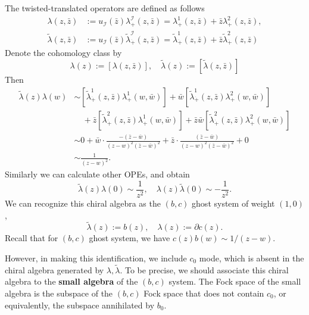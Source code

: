 \documentclass[a4paper,11pt]{article}
\begin{document}
The twisted-translated operators are defined as follows
\begin{equation}
\begin{aligned}
    \lambda(z, \bar{z}) &:= u_\mathcal{I}(\bar{z}) \lambda_+^\mathcal{I}(z, \bar{z}) = \lambda^1_+(z, \bar{z}) + \bar{z} \lambda^2_+(z, \bar{z}),\\
    \tilde{\lambda}(z, \bar{z}) &:= u_\mathcal{I}(\bar{z}) \tilde{\lambda}_{\dot{+}}^\mathcal{I}(z, \bar{z}) = \tilde{\lambda}^1_{\dot{+}}(z, \bar{z}) + \bar{z} \tilde{\lambda}^2_{\dot{+}}(z, \bar{z})
\end{aligned}
\end{equation}
Denote the cohomology class by
\begin{equation}
    \lambda(z) := [\lambda(z, \bar{z})], \quad \tilde{\lambda}(z) := [\tilde{\lambda}(z, \bar{z})]
\end{equation}
Then
\begin{equation}
\begin{aligned}
    \tilde{\lambda}(z) \lambda(w) &\sim [\tilde{\lambda}^1_{\dot{+}}(z, \bar{z}) \lambda^1_+(w, \bar{w})] + \bar{w} [\tilde{\lambda}^1_{\dot{+}}(z, \bar{z}) \lambda_+^2(w, \bar{w})] \\
    & \quad + \bar{z} [\tilde{\lambda}^2_{\dot{+}}(z, \bar{z}) \lambda_+^1(w, \bar{w})] + \bar{z} \bar{w} [\tilde{\lambda}^2_{\dot{+}}(z, \bar{z}) \lambda_+^2(w, \bar{w})]\\
    &\sim 0 + \bar{w} \cdot \frac{-(\bar{z} - \bar{w})}{(z-w)^2 (\bar{z} - \bar{w})^2} + \bar{z} \cdot \frac{(\bar{z} - \bar{w})}{(z-w)^2 (\bar{z}- \bar{w})^2} + 0\\
    &\sim \frac{1}{(z-w)^2}.
\end{aligned}
\end{equation}
Similarly we can calculate other OPEs, and obtain
\begin{equation}
    \tilde{\lambda}(z) \lambda(0) \sim \frac{1}{z^2}, \quad \lambda(z) \tilde{\lambda}(0) \sim - \frac{1}{z^2}.
\end{equation}
We can recognize this chiral algebra as the $(b,c)$ ghost system of weight $(1,0)$,
\begin{equation}
    \tilde{\lambda}(z) := b(z), \quad \lambda(z) := \partial c(z).
\end{equation}
Recall that for $(b,c)$ ghost system, we have $c(z) b(w) \sim 1/(z-w)$.

However, in making this identification, we include $c_0$ mode, which is absent in the chiral algebra generated by $\lambda, \tilde{\lambda}$. To be precise, we should associate this chiral algebra to the \textbf{small algebra} of the $(b,c)$ system. The Fock space of the small algebra is the subspace of the $(b,c)$ Fock space that does not contain $c_0$, or equivalently, the subspace annihilated by $b_0$.
\end{document}
